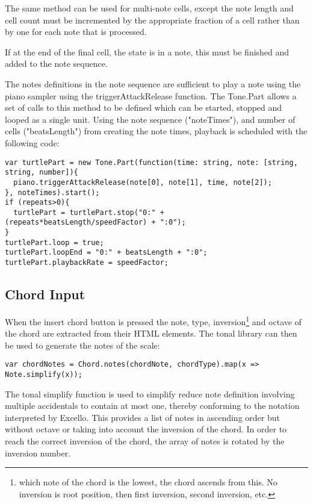 The same method can be used for multi-note cells, except the note length and cell count must be incremented by the appropriate fraction of a cell rather than by one for each note that is processed.

If at the end of the final cell, the state is in a note, this must be finished and added to the note sequence.

The notes definitions in the note sequence are sufficient to play a note using the piano sampler using the triggerAttackRelease function. The Tone.Part allows a set of calls to this method to be defined which can be started, stopped and looped as a single unit. Using the note sequence ("noteTimes"), and number of cells ("beatsLength") from creating the note times, playback is scheduled with the following code:

\begin{verbatim}
var turtlePart = new Tone.Part(function(time: string, note: [string, string, number]){
  piano.triggerAttackRelease(note[0], note[1], time, note[2]);
}, noteTimes).start();
if (repeats>0){
  turtlePart = turtlePart.stop("0:" + (repeats*beatsLength/speedFactor) + ":0");
}
turtlePart.loop = true;
turtlePart.loopEnd = "0:" + beatsLength + ":0";
turtlePart.playbackRate = speedFactor;
\end{verbatim}

\subsection{Chord Input}

When the insert chord button is pressed the note, type, inversion\footnote{which note of the chord is the lowest, the chord ascends from this. No inversion is root position, then first inversion, second inversion, etc.} and octave of the chord are extracted from their HTML elements. The tonal library can then be used to generate the notes of the scale:

\begin{verbatim}
var chordNotes = Chord.notes(chordNote, chordType).map(x => Note.simplify(x));
\end{verbatim}

The tonal simplify function is used to simplify reduce note definition involving multiple accidentals to contain at most one, thereby conforming to the notation interpreted by Excello. This provides a list of notes in ascending order but without octave or taking into account the inversion of the chord. In order to reach the correct inversion of the chord, the array of notes is rotated by the inversion number.

